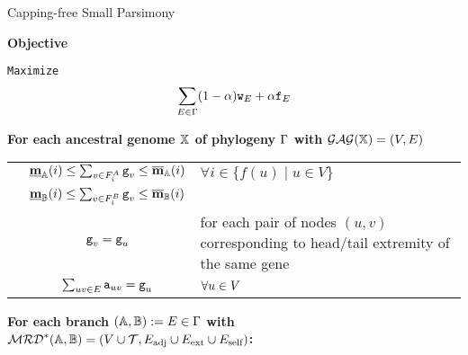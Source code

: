 
\begin{algorithm}[tbh]
\caption{Capping-free Small Parsimony}
\textbf{Objective}

\newcommand{\idx}{\texttt{ix}}
\hspace{0.5cm}\texttt{Maximize} 
\begin{equation*}
    \sum_{E \in\Gamma} (1-\alpha) {\texttt{w}}_E + \alpha {\texttt{f}}_E 
\end{equation*}


\textbf{For each ancestral genome $\mathbb{X}$ of phylogeny $\Gamma$ with $\mathcal{GAG}(\mathbb{X}) = (V, E)$}

\begin{constraints}
\begin{tabular}{lcl}
    \cns \label{c:cn} & $\underline{\mathbf{m}}_{\mathbb{A}}(i) \leq \sum_{v \in F^A_i} {\texttt{g}}_v \leq \overline{\mathbf{m}}_{\mathbb{A}}(i)$ & $\forall i \in \{f(u) \mid u \in V\}$\\
    & $\underline{\mathbf{m}}_{\mathbb{B}}(i) \leq \sum_{v \in F^B_i} {\texttt{g}}_v \leq \overline{\mathbf{m}}_{\mathbb{B}}(i)$ & \\
    \cns \label{c:cn_consistent}& ${\texttt{g}}_v = {\texttt{g}}_u$ & for each pair of nodes $(u, v)$ corresponding to head/tail extremity of the same gene\todoDany{improve}\\
    \cns \label{c:genome}& $\sum_{uv \in E} {\texttt{a}}_{uv} = {\texttt{g}}_u$ & $\forall u \in V$\\
\end{tabular}
\end{constraints}

\medskip
{}

\textbf{For each branch $(\mathbb{A},\mathbb{B}):=E\in \Gamma$ with $\mathcal{MRD}^*(\mathbb{A},\mathbb{B}) = (V\cup\mathcal{T}, {E}_\text{adj} \cup {E}_{\text{ext}} \cup {E}_\text{self})$:}

\begin{constraints}
\begin{tabular}{lcl}


\end{tabular}
\end{constraints}
\end{algorithm}
